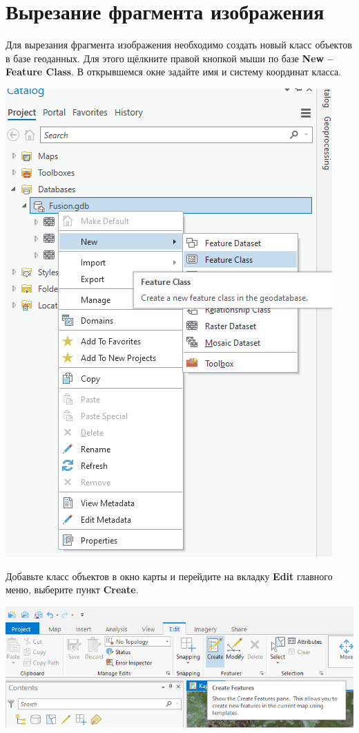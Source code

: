 \documentclass[
  12pt,
]{book}
\begin{document}
\hypertarget{pansharpen-extract}{%
\section{Вырезание фрагмента изображения}\label{pansharpen-extract}}

Для вырезания фрагмента изображения необходимо создать новый класс объектов в базе геоданных. Для этого щёлкните правой кнопкой мыши по базе \textbf{New -- Feature Class}. В открывшемся окне задайте имя и систему координат класса.

\includegraphics{images/Ref01/New_FC.png}

Добавьте класс объектов в окно карты и перейдите на вкладку \textbf{Edit} главного меню, выберите пункт \textbf{Create}.

\includegraphics{images/Ref01/Create.png}
\end{document}
